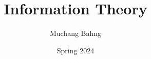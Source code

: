\documentclass{article}
\newcounter{code}[section]
\begin{document}
\title{Information Theory} 
\author{Muchang Bahng}
\date{Spring 2024}

\maketitle
\tableofcontents
\pagebreak









\end{document}
